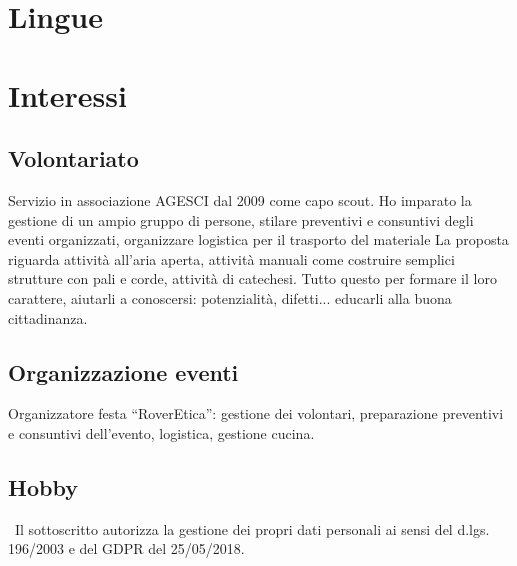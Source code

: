 \documentclass[12pt,a4paper,sans]{moderncv} %
\begin{document}
\section{Lingue}


\section{Interessi}
\subsection{Volontariato}
Servizio in associazione AGESCI dal 2009 come capo scout. Ho imparato la gestione di un ampio gruppo di persone, stilare preventivi e consuntivi degli eventi organizzati, organizzare logistica per il trasporto del materiale
La proposta riguarda attività all'aria aperta, attività manuali come costruire semplici strutture con pali e corde, attività di catechesi. Tutto questo per formare il loro carattere, aiutarli a conoscersi: potenzialità, difetti... educarli alla buona cittadinanza.
\subsection{Organizzazione eventi}
Organizzatore festa “RoverEtica”: gestione dei volontari, preparazione preventivi e consuntivi dell’evento, logistica, gestione cucina.
\subsection{Hobby}
%

\
Il sottoscritto autorizza la gestione dei propri dati personali ai sensi del d.lgs. 196/2003 e del GDPR del 25/05/2018.
\end{document}
